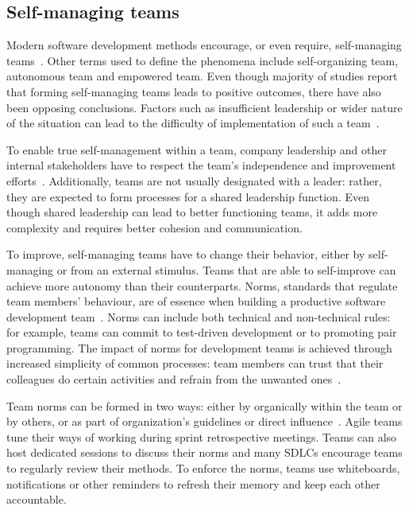 \subsection{Self-managing teams}

Modern software development methods encourage, or even require, self-managing teams~\cite{moe_teamwork_2010}. Other terms used to define the phenomena include self-organizing team, autonomous team and empowered team. Even though majority of studies report that forming self-managing teams leads to positive outcomes, there have also been opposing conclusions. Factors such as insufficient leadership or wider nature of the situation can lead to the difficulty of implementation of such a team~\cite{moe_teamwork_2010}. 

To enable true self-management within a team, company leadership and other internal stakeholders have to respect the team's independence and improvement efforts~\cite{moe_overcoming_2010}. Additionally, teams are not usually designated with a leader: rather, they are expected to form processes for a shared leadership function. Even though shared leadership can lead to better functioning teams, it adds more complexity and requires better cohesion and communication.~\cite{solansky_leadership_2008}

To improve, self-managing teams have to change their behavior, either by self-managing or from an external stimulus. Teams that are able to self-improve can achieve more autonomy than their counterparts. Norms, standards that regulate team members' behaviour, are of essence when building a productive software development team~\cite{abrahamsson_exploring_2016}. Norms can include both technical and non-technical rules: for example, teams can commit to test-driven development or to promoting pair programming. The impact of norms for development teams is achieved through increased simplicity of common processes: team members can trust that their colleagues do certain activities and refrain from the unwanted ones~\cite{abrahamsson_exploring_2016}. 

Team norms can be formed in two ways: either by organically within the team or by others, or as part of organization's guidelines or direct influence~\cite{teh_social_2012}. Agile teams tune their ways of working during sprint retrospective meetings. Teams can also host dedicated sessions to discuss their norms and many SDLCs encourage teams to regularly review their methods. To enforce the norms, teams use whiteboards, notifications or other reminders to refresh their memory and keep each other accountable. 

